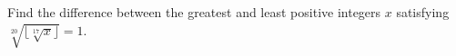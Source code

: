 Find the difference between the greatest and least positive integers $ x $ satisfying $\sqrt[20]{\lfloor\sqrt[17]{x}\rfloor}=1 $.
